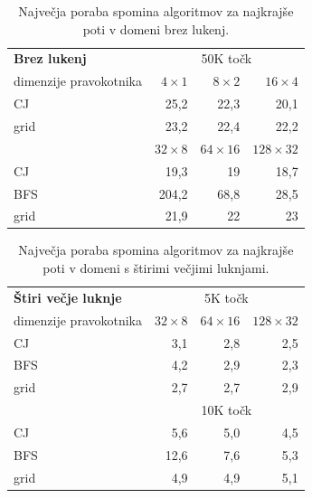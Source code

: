 \documentclass[a4paper, 12pt]{book}
\begin{document}
\begin{table}[htp]
\begin{center}
\begin{tabular}{l*{3}{r}}
\textbf{Brez lukenj} & \multicolumn{3}{c}{50K točk}\\						
dimenzije pravokotnika	&	$4\times 1$	&	$8\times 2$	&	$16\times 4$ \\
\hline
CJ	&	25,2	&	22,3	&	20,1		\\
grid	&	23,2	&	22,4	&	22,2	\vspace{.2cm}	\\

&	$32\times 8$	&	$64\times 16$	&	$128\times 32$	\\
\hline
CJ &	19,3	&	19	&	18,7 \\
BFS &	204,2	&	68,8	&	28,5 \\
grid &	21,9	&	22	&	23 \vspace{.2cm} \\
\end{tabular}
\caption{Največja poraba spomina algoritmov za najkrajše poti v domeni brez lukenj.}
\label{table-ram-tree-1}
\end{center}
\end{table}

\begin{table}[htp]
\begin{center}
\begin{tabular}{l*{3}{r}}
\textbf{Štiri večje luknje} & \multicolumn{3}{c}{5K točk}\\						
dimenzije pravokotnika	&	$32\times 8$	&	$64\times 16$	&	$128\times 32$	\\
\hline
CJ	&	3,1	&	2,8	&	2,5		\\
BFS &	4,2	&	2,9	&	2,3 \\
grid	&	2,7	&	2,7	&	2,9	\vspace{.2cm}	\\
\hline
& \multicolumn{3}{c}{10K točk} \\
\hline
CJ	&	5,6	 &	5,0	&	4,5		\\
BFS &	12,6	&	7,6	&	5,3 \\
grid	&	4,9	&	4,9	&	5,1	\vspace{.2cm}	\\
\end{tabular}
\caption{Največja poraba spomina algoritmov za najkrajše poti v domeni s štirimi večjimi luknjami.}
\label{table-ram-tree-2}
\end{center}
\end{table}
\end{document}
